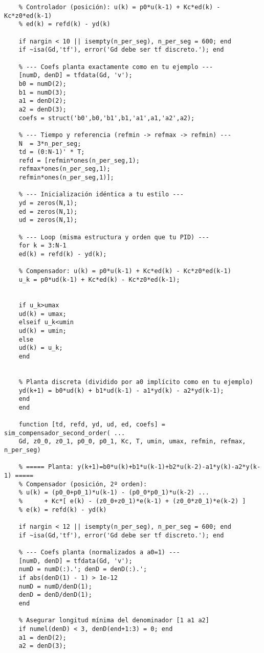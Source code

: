 \begin{lstlisting}[style=matlabstyle,caption={Funciones desarrolladas para la práctica.},label={matlab:func}]
	% ===== Igual que tu PID: y(k+1)=b0*u(k)+b1*u(k-1)-a1*y(k)-a2*y(k-1) =====
	% Controlador (posición): u(k) = p0*u(k-1) + Kc*ed(k) - Kc*z0*ed(k-1)
	% ed(k) = refd(k) - yd(k)
	
	if nargin < 10 || isempty(n_per_seg), n_per_seg = 600; end
	if ~isa(Gd,'tf'), error('Gd debe ser tf discreto.'); end
	
	% --- Coefs planta exactamente como en tu ejemplo ---
	[numD, denD] = tfdata(Gd, 'v');
	b0 = numD(2);
	b1 = numD(3);
	a1 = denD(2);
	a2 = denD(3);
	coefs = struct('b0',b0,'b1',b1,'a1',a1,'a2',a2);
	
	% --- Tiempo y referencia (refmin -> refmax -> refmin) ---
	N  = 3*n_per_seg;
	td = (0:N-1)' * T;
	refd = [refmin*ones(n_per_seg,1);
	refmax*ones(n_per_seg,1);
	refmin*ones(n_per_seg,1)];
	
	% --- Inicialización idéntica a tu estilo ---
	yd = zeros(N,1);
	ed = zeros(N,1);
	ud = zeros(N,1);
	
	% --- Loop (misma estructura y orden que tu PID) ---
	for k = 3:N-1
	ed(k) = refd(k) - yd(k);
	
	% Compensador: u(k) = p0*u(k-1) + Kc*ed(k) - Kc*z0*ed(k-1)
	u_k = p0*ud(k-1) + Kc*ed(k) - Kc*z0*ed(k-1);
	
	
	if u_k>umax
	ud(k) = umax;
	elseif u_k<umin
	ud(k) = umin;
	else 
	ud(k) = u_k;
	end
	
	
	% Planta discreta (dividido por a0 implícito como en tu ejemplo)
	yd(k+1) = b0*ud(k) + b1*ud(k-1) - a1*yd(k) - a2*yd(k-1);
	end
	end
	
	function [td, refd, yd, ud, ed, coefs] = sim_compensador_second_order( ...
	Gd, z0_0, z0_1, p0_0, p0_1, Kc, T, umin, umax, refmin, refmax, n_per_seg)
	
	% ===== Planta: y(k+1)=b0*u(k)+b1*u(k-1)+b2*u(k-2)-a1*y(k)-a2*y(k-1) =====
	% Compensador (posición, 2º orden):
	% u(k) = (p0_0+p0_1)*u(k-1) - (p0_0*p0_1)*u(k-2) ...
	%      + Kc*[ e(k) - (z0_0+z0_1)*e(k-1) + (z0_0*z0_1)*e(k-2) ]
	% e(k) = refd(k) - yd(k)
	
	if nargin < 12 || isempty(n_per_seg), n_per_seg = 600; end
	if ~isa(Gd,'tf'), error('Gd debe ser tf discreto.'); end
	
	% --- Coefs planta (normalizados a a0=1) ---
	[numD, denD] = tfdata(Gd, 'v');
	numD = numD(:).'; denD = denD(:).';
	if abs(denD(1) - 1) > 1e-12
	numD = numD/denD(1);
	denD = denD/denD(1);
	end
	
	% Asegurar longitud mínima del denominador [1 a1 a2]
	if numel(denD) < 3, denD(end+1:3) = 0; end
	a1 = denD(2);
	a2 = denD(3);
	

\end{lstlisting}
